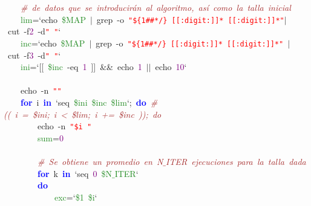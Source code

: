 \mbox{}\ \ \ \ \textit{\textcolor{Brown}{\#\ de\ datos\ que\ se\ introducirán\ al\ algoritmo,\ así\ como\ la\ talla\ inicial}} \\
\mbox{}\ \ \ \ \textcolor{ForestGreen}{lim}\textcolor{BrickRed}{=}`echo\ \textcolor{ForestGreen}{\$MAP}\ \textcolor{BrickRed}{$|$}\ grep\ -o\ \texttt{\textcolor{Red}{"{}\$\{1\#\#*/\}\ [[:digit:]]*\ [[:digit:]]*"{}}}\textcolor{BrickRed}{$|$}\ cut\ -f\textcolor{Purple}{2}\ -d\texttt{\textcolor{Red}{"{}\ "{}}}` \\
\mbox{}\ \ \ \ \textcolor{ForestGreen}{inc}\textcolor{BrickRed}{=}`echo\ \textcolor{ForestGreen}{\$MAP}\ \textcolor{BrickRed}{$|$}\ grep\ -o\ \texttt{\textcolor{Red}{"{}\$\{1\#\#*/\}\ [[:digit:]]*\ [[:digit:]]*"{}}}\ \textcolor{BrickRed}{$|$}\ cut\ -f\textcolor{Purple}{3}\ -d\texttt{\textcolor{Red}{"{}\ "{}}}` \\
\mbox{}\ \ \ \ \textcolor{ForestGreen}{ini}\textcolor{BrickRed}{=}`\textcolor{BrickRed}{[[}\ \textcolor{ForestGreen}{\$inc}\ -eq\ \textcolor{Purple}{1}\ \textcolor{BrickRed}{]]}\ \textcolor{BrickRed}{\&\&}\ echo\ \textcolor{Purple}{1}\ \textcolor{BrickRed}{$|$$|$}\ echo\ \textcolor{Purple}{10}` \\
\mbox{}\ \ \ \  \\
\mbox{}\ \ \ \ echo\ -n\ \texttt{\textcolor{Red}{"{}"{}}} \\
\mbox{}\ \ \ \ \textbf{\textcolor{Blue}{for}}\ i\ \textbf{\textcolor{Blue}{in}}\ `seq\ \textcolor{ForestGreen}{\$ini}\ \textcolor{ForestGreen}{\$inc}\ \textcolor{ForestGreen}{\$lim}`\textcolor{BrickRed}{;}\ \textbf{\textcolor{Blue}{do}}\ \textit{\textcolor{Brown}{\#((\ i\ =\ \$ini;\ i\ \textless{}\ \$lim;\ i\ +=\ \$inc\ ));\ do}} \\
\mbox{}\ \ \ \ \ \ \ \ echo\ -n\ \texttt{\textcolor{Red}{"{}\$i\ "{}}} \\
\mbox{}\ \ \ \ \ \ \ \ \textcolor{ForestGreen}{sum}\textcolor{BrickRed}{=}\textcolor{Purple}{0} \\
\mbox{}\ \ \ \ \ \ \ \  \\
\mbox{}\ \ \ \ \ \ \ \ \textit{\textcolor{Brown}{\#\ Se\ obtiene\ un\ promedio\ en\ N$\_$ITER\ ejecuciones\ para\ la\ talla\ dada}} \\
\mbox{}\ \ \ \ \ \ \ \ \textbf{\textcolor{Blue}{for}}\ k\ \textbf{\textcolor{Blue}{in}}\ `seq\ \textcolor{Purple}{0}\ \textcolor{ForestGreen}{\$N$\_$ITER}` \\
\mbox{}\ \ \ \ \ \ \ \ \textbf{\textcolor{Blue}{do}} \\
\mbox{}\ \ \ \ \ \ \ \ \ \ \ \ \textcolor{ForestGreen}{exc}\textcolor{BrickRed}{=}`\textcolor{ForestGreen}{\$1}\ \textcolor{ForestGreen}{\$i}` \\
